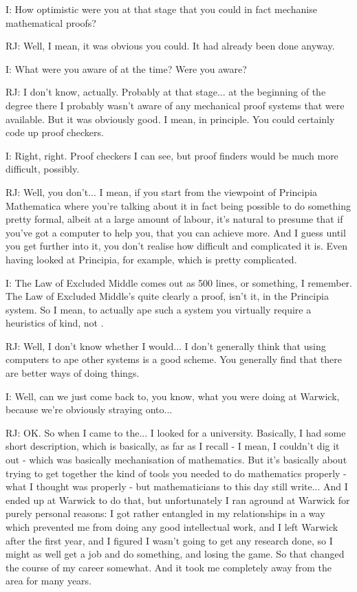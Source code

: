 \documentclass[10pt,titlepage]{book}
\begin{document}
I: How optimistic were you at that stage that you could in fact mechanise mathematical proofs?

RJ: Well, I mean, it was obvious you could. It had already been done anyway.

I: What were you aware of at the time? Were you aware?

RJ: I don't know, actually. Probably at that stage... at the beginning of the degree there I probably wasn't aware of any mechanical proof systems that were available. But it was obviously good. I mean, in principle. You could certainly code up proof checkers.

I: Right, right. Proof checkers I can see, but proof finders would be much more difficult, possibly.

RJ: Well, you don't... I mean, if you start from the viewpoint of Principia Mathematica where you're talking about it in fact being possible to do something pretty formal, albeit at a large amount of labour, it's natural to presume that if you've got a computer to help you, that you can achieve more. And I guess until you get further into it, you don't realise how difficult and complicated it is. Even having looked at Principia, for example, which is pretty complicated.

I: The Law of Excluded Middle comes out as 500 lines, or something, I remember. The Law of Excluded Middle's quite clearly a proof, isn't it, in the Principia system. So I mean, to actually ape such a system you virtually require a heuristics of kind, not	.

RJ: Well, I don't know whether I would... I don't generally think that using computers to ape other systems is a good scheme. You generally find that there are better ways of doing things.

I: Well, can we just come back to, you know, what you were doing at Warwick, because we're obviously straying onto...

RJ: OK. So when I came to the... I looked for a university. Basically, I had some short description, which is basically, as far as I recall - I mean, I couldn't dig it out - which was basically mechanisation of mathematics. But it's basically about trying to get together the kind of tools you needed to do mathematics properly - what I thought was properly - but mathematicians to this day still write... And I ended up at Warwick to do that, but unfortunately I ran aground at Warwick for purely personal reasons: I got rather entangled in my relationships in a way which prevented me from doing any good intellectual work, and I left Warwick after the first year, and I figured I wasn't going to get any research done, so I might as well get a job and do something, and losing the game. So that changed the course of my career somewhat. And it took me completely away from the area for many years.
\end{document}
